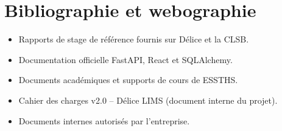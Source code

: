 \documentclass[12pt,a4paper,oneside]{report}
\begin{document}
\chapter*{Bibliographie et webographie}
\begin{itemize}
\item Rapports de stage de référence fournis sur Délice et la CLSB.
\item Documentation officielle FastAPI, React et SQLAlchemy.
\item Documents académiques et supports de cours de ESSTHS.
\item Cahier des charges v2.0 -- Délice LIMS (document interne du projet).
\item Documents internes autorisés par l'entreprise.
\end{itemize}
\end{document}
